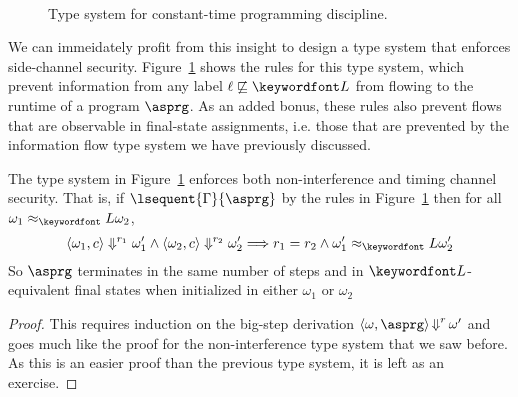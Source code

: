 \documentclass[11pt,twoside]{scrartcl}
\begin{document}
\begin{figure}
\begin{calculuscollections}{\textwidth}
\begin{calculus}
{{}{
  \lsequent{\Gamma}{\asprg;\bsprg}
}}{}%
\end{calculus}
\\[1em]
\begin{calculus}
{\linferenceRule[sequent] {
  \lsequent{\Gamma}{\ivr : \lowsec}
  &\lsequent{\Gamma}{\asprg}
  &\lsequent{\Gamma}{\bsprg}
}{
  \lsequent{\Gamma}{\pif{\ivr}{\asprg}{\bsprg}}
}}{}%
\end{calculus}
\hspace{\linferenceRulehskipamount}
\begin{calculus}
{\linferenceRule[sequent] {
  \lsequent{\Gamma}{\ivr : \lowsec}
  &\lsequent{\Gamma}{\asprg}
}{
  \lsequent{\Gamma}{\pwhile{\ivr}{\asprg}}
}}{}%
\end{calculus}
\end{calculuscollections}

\caption{Type system for constant-time programming discipline.}
\label{fig:const-types}
\end{figure}

We can immeidately profit from this insight to design a type system that enforces side-channel security. Figure~\ref{fig:const-types} shows the rules for this type system, which prevent information from any label $\ell \not\sqsubseteq \lowsec$ from flowing to the runtime of a program $\asprg$. As an added bonus, these rules also prevent flows that are observable in final-state assignments, i.e. those that are prevented by the information flow type system we have previously discussed.

\begin{theorem}
\label{thm:sidechan-types}
The type system in Figure~\ref{fig:const-types} enforces both non-interference and timing channel security. That is, if $\lsequent{\Gamma}{\asprg}$ by the rules in Figure~\ref{fig:const-types} then for all $\omega_1\approx_\lowt\omega_2$, 
\[
\langle \omega_1, c\rangle \Downarrow^{r_1} \omega_1' \land \langle\omega_2, c\rangle\Downarrow^{r_2}\omega_2' \Longrightarrow r_1 = r_2 \land \omega_1' \approx_\lowt \omega_2'
\]
So $\asprg$ terminates in the same number of steps and in $\lowsec$-equivalent final states when initialized in either $\omega_1$ or $\omega_2$
\end{theorem}
\begin{proof}
This requires induction on the big-step derivation $\langle\omega,\asprg\rangle \bigstep^r \omega'$ and goes much like the proof for the non-interference type system that we saw before. As this is an easier proof than the previous type system, it is left as an exercise.
\end{proof}
\end{document}
